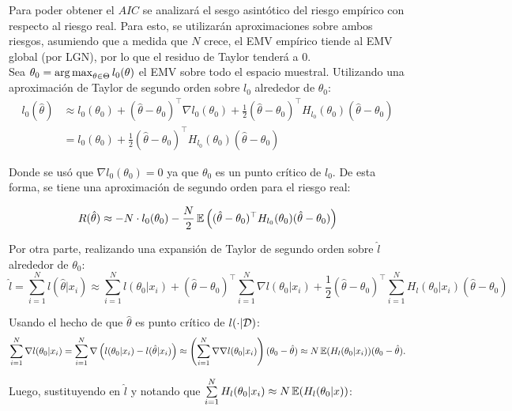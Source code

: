 Para poder obtener el $AIC$ se analizará el sesgo asintótico del riesgo empírico con respecto al riesgo real. Para esto, se utilizarán aproximaciones sobre ambos riesgos, asumiendo que a medida que $N$ crece, el EMV empírico tiende al EMV global (por LGN), por lo que el residuo de Taylor tenderá a 0.\\

Sea $\theta_0 = \operatorname*{arg\,max}_{\theta\in\Theta} l_0(\theta)$ el EMV sobre todo el espacio muestral. Utilizando una aproximación de Taylor de segundo orden sobre $l_0$ alrededor de $\theta_0$:
\begin{align}
	l_0(\hat{\theta})&\approx l_0(\theta_0) + (\hat{\theta}-\theta_0)^\top \nabla l_0(\theta_0) + \frac{1}{2}(\hat{\theta}-\theta_0)^\top H_{l_0}(\theta_0) (\hat{\theta}-\theta_0)\\
	&= l_0(\theta_0) + \frac{1}{2}(\hat{\theta}-\theta_0)^\top H_{l_0}(\theta_0) (\hat{\theta}-\theta_0)
\end{align}

Donde se usó que $\nabla l_0(\theta_0)=0$ ya que $\theta_0$ es un punto crítico de $l_0$. De esta forma, se tiene una aproximación de segundo orden para el riesgo real:

\begin{equation*}
	R(\hat{\theta}) \approx -N \cdot l_0(\theta_0) - \frac{N}{2}\operatorname{\mathbb{E}}\left((\hat{\theta}-\theta_0)^\top H_{l_0}(\theta_0) (\hat{\theta}-\theta_0)\right)
\end{equation*}

Por otra parte, realizando una expansión de Taylor de segundo orden sobre $\hat{l}$ alrededor de $\theta_0$:
\begin{equation}
	\hat{l} = \sum_{i=1}^N l(\hat{\theta}|x_i) \approx \sum_{i=1}^N l(\theta_0|x_i) + (\hat{\theta}-\theta_0)^\top \sum_{i=1}^N \nabla l(\theta_0|x_i) + \frac{1}{2}(\hat{\theta}-\theta_0)^\top \sum_{i=1}^N H_l(\theta_0|x_i) (\hat{\theta}-\theta_0)
\end{equation}

Usando el hecho de que $\hat{\theta}$ es punto crítico de $l(\cdot|{\mathcal D})$:
\begin{equation}
	\sum_{i=1}^N \nabla l(\theta_0|x_i) = \sum_{i=1}^N \nabla \left(l(\theta_0|x_i) - l(\hat{\theta}|x_i)\right) \approx \left(\sum_{i=1}^N \nabla\nabla l(\theta_0|x_i)\right) (\theta_0-\hat{\theta}) \approx N \operatorname{\mathbb{E}}(H_l(\theta_0|x_i)) (\theta_0-\hat{\theta}).
\end{equation}

Luego, sustituyendo en $\hat{l}$ y notando que $\sum\limits_{i=1}^N H_l(\theta_0|x_i) \approx N\operatorname{\mathbb{E}}(H_l(\theta_0|x))$:

